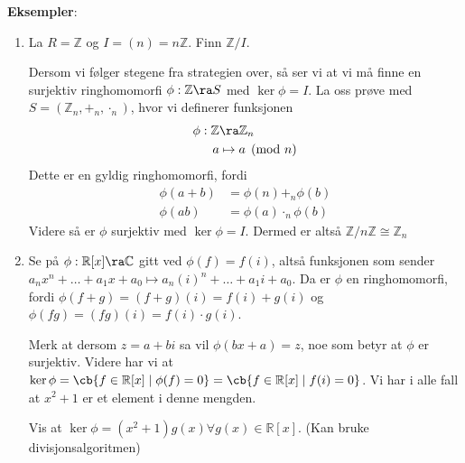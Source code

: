 \textbf{Eksempler}:
\begin{enumerate}
  \item La $R=\mathbb{Z}$ og $I=(n)=n \mathbb{Z}$. Finn $\mathbb{Z}/I$.

    Dersom vi følger stegene fra strategien over, så ser vi at vi må finne en surjektiv
    ringhomomorfi $\phi: \mathbb{Z}\ra S$ med $\ker\phi=I$. La oss prøve med 
    $S=(\mathbb{Z}_n,+_n,\cdot_n)$, hvor vi definerer funksjonen
    \begin{align}
      \phi: \mathbb{Z}&\ra \mathbb{Z}_n \\
      a&\mapsto a\pmod n
    \end{align}
    Dette er en gyldig ringhomomorfi, fordi
    \begin{align}
      \phi(a+b)&=\phi(n)+_n\phi(b) \\
      \phi(ab)&=\phi(a)\cdot_n\phi(b)
    \end{align}
    Videre så er $\phi$ surjektiv med $\ker\phi=I$. Dermed er altså 
    $\mathbb{Z}/ n \mathbb{Z}\cong \mathbb{Z}_n$
  \item Se på $\phi: \mathbb{R}[x]\ra \mathbb{C}$ gitt ved $\phi(f)=f(i)$, altså funksjonen som
    sender $a_nx^n+\dots+a_1x+a_0\mapsto a_n(i)^n+\dots+a_1i+a_0$. Da er $\phi$ en ringhomomorfi,
    fordi $\phi(f+g)=(f+g)(i)=f(i)+g(i)$ og $\phi(fg)=(fg)(i)=f(i)\cdot g(i)$.

    Merk at dersom $z=a+bi$ sa vil $\phi(bx+a)=z$, noe som betyr at $\phi$ er surjektiv. Videre har
    vi at $\ker\phi=\cb{f\in \mathbb{R}[x]\mid\phi(f)=0}=\cb{f\in \mathbb{R}[x]\mid f(i)=0}$. Vi 
    har i alle fall at $x^2+1$ er et element i denne mengden. 

    Vis at $\ker\phi=(x^2+1)g(x)\forall g(x)\in \mathbb{R}[x]$. (Kan bruke divisjonsalgoritmen)
\end{enumerate}

